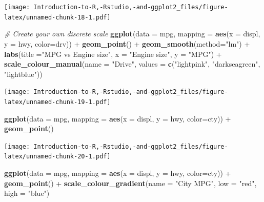 \documentclass[]{book}
\newenvironment{Shaded}{\begin{snugshade}}{\end{snugshade}}
\newcommand{\KeywordTok}[1]{\textcolor[rgb]{0.13,0.29,0.53}{\textbf{{#1}}}}
\newcommand{\DataTypeTok}[1]{\textcolor[rgb]{0.13,0.29,0.53}{{#1}}}
\newcommand{\StringTok}[1]{\textcolor[rgb]{0.31,0.60,0.02}{{#1}}}
\newcommand{\CommentTok}[1]{\textcolor[rgb]{0.56,0.35,0.01}{\textit{{#1}}}}
\newcommand{\NormalTok}[1]{{#1}}
\begin{document}
\texttt{[image: Introduction-to-R,-Rstudio,-and-ggplot2\_files/figure-latex/unnamed-chunk-18-1.pdf]}

\begin{Shaded}
\begin{Highlighting}[]
\CommentTok{# Create your own discrete scale}
\KeywordTok{ggplot}\NormalTok{(}\DataTypeTok{data =} \NormalTok{mpg, }\DataTypeTok{mapping =} \KeywordTok{aes}\NormalTok{(}\DataTypeTok{x =} \NormalTok{displ, }\DataTypeTok{y =} \NormalTok{hwy, }\DataTypeTok{color=}\NormalTok{drv)) +}\StringTok{ }\KeywordTok{geom_point}\NormalTok{() +}\StringTok{ }\KeywordTok{geom_smooth}\NormalTok{(}\DataTypeTok{method=}\StringTok{"lm"}\NormalTok{) +}\StringTok{ }\KeywordTok{labs}\NormalTok{(}\DataTypeTok{title =}\StringTok{"MPG vs Engine size"}\NormalTok{, }\DataTypeTok{x =} \StringTok{"Engine size"}\NormalTok{, }\DataTypeTok{y =} \StringTok{"MPG"}\NormalTok{) +}\StringTok{ }\KeywordTok{scale_colour_manual}\NormalTok{(}\DataTypeTok{name =} \StringTok{"Drive"}\NormalTok{, }\DataTypeTok{values =} \KeywordTok{c}\NormalTok{(}\StringTok{"lightpink"}\NormalTok{, }\StringTok{"darkseagreen"}\NormalTok{, }\StringTok{"lightblue"}\NormalTok{))}
\end{Highlighting}
\end{Shaded}

\texttt{[image: Introduction-to-R,-Rstudio,-and-ggplot2\_files/figure-latex/unnamed-chunk-19-1.pdf]}

\begin{Shaded}
\begin{Highlighting}[]
\KeywordTok{ggplot}\NormalTok{(}\DataTypeTok{data =} \NormalTok{mpg, }\DataTypeTok{mapping =} \KeywordTok{aes}\NormalTok{(}\DataTypeTok{x =} \NormalTok{displ, }\DataTypeTok{y =} \NormalTok{hwy, }\DataTypeTok{color=}\NormalTok{cty)) +}\StringTok{ }\KeywordTok{geom_point}\NormalTok{() }
\end{Highlighting}
\end{Shaded}

\texttt{[image: Introduction-to-R,-Rstudio,-and-ggplot2\_files/figure-latex/unnamed-chunk-20-1.pdf]}

\begin{Shaded}
\begin{Highlighting}[]
\KeywordTok{ggplot}\NormalTok{(}\DataTypeTok{data =} \NormalTok{mpg, }\DataTypeTok{mapping =} \KeywordTok{aes}\NormalTok{(}\DataTypeTok{x =} \NormalTok{displ, }\DataTypeTok{y =} \NormalTok{hwy, }\DataTypeTok{color=}\NormalTok{cty)) +}\StringTok{ }\KeywordTok{geom_point}\NormalTok{() +}\StringTok{ }\KeywordTok{scale_colour_gradient}\NormalTok{(}\DataTypeTok{name =} \StringTok{"City MPG"}\NormalTok{, }\DataTypeTok{low =} \StringTok{"red"}\NormalTok{, }\DataTypeTok{high =} \StringTok{"blue"}\NormalTok{)}
\end{Highlighting}
\end{Shaded}
\end{document}
